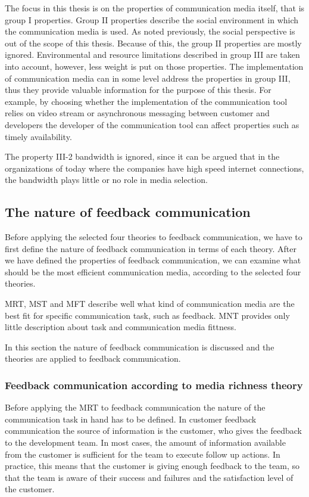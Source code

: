 \documentclass[english,12pt,a4paper,pdftex]{article}
\begin{document}
The focus in this thesis is on the properties of communication media itself, that is group I properties. Group II properties describe the social environment in which the communication media is used. As noted previously, the social perspective is out of the scope of this thesis. Because of this, the group II properties are mostly ignored. Environmental and resource limitations described in group III are taken into account, however, less weight is put on those properties. The implementation of communication media can in some level address the properties in group III, thus they provide valuable information for the purpose of this thesis. For example, by choosing whether the implementation of the communication tool relies on video stream or asynchronous messaging between customer and developers the developer of the communication tool can affect properties such as timely availability.

The property III-2 bandwidth is ignored, since it can be argued that in the organizations of today where the companies have high speed internet connections, the bandwidth plays little or no role in media selection.

\subsection{The nature of feedback communication}

Before applying the selected four theories to feedback communication, we have to first define the nature of feedback communication in terms of each theory. After we have defined the properties of feedback communication, we can examine what should be the most efficient communication media, according to the selected four theories.

\Ac{MRT}, \ac{MST} and \ac{MFT} describe well what kind of communication media are the best fit for specific communication task, such as feedback. \Ac{MNT} provides only little description about task and communication media fittness.

In this section the nature of feedback communication is discussed and the theories are applied to feedback communication.

\subsubsection{Feedback communication according to media richness theory}

Before applying the \ac{MRT} to feedback communication the nature of the communication task in hand has to be defined. In customer feedback communication the source of information is the customer, who gives the feedback to the development team. In most cases, the amount of information available from the customer is sufficient for the team to execute follow up actions. In practice, this means that the customer is giving enough feedback to the team, so that the team is aware of their success and failures and the satisfaction level of the customer.
\end{document}
